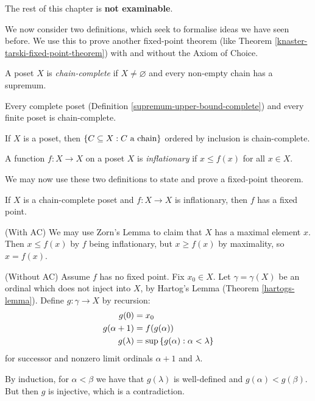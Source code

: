 \documentclass{article}
\begin{document}
\begin{note}
	The rest of this chapter is \textbf{not examinable}.
\end{note}

We now consider two definitions, which seek to formalise ideas we have seen before. We use this to prove another fixed-point theorem (like Theorem \ref{knaster-tarski-fixed-point-theorem}) with and without the Axiom of Choice.

\begin{definition}
    A poset $X$ is \textit{chain-complete} if $X \neq \varnothing$ and every non-empty chain has a supremum.
\end{definition}

\begin{corollary}
    Every complete poset (Definition \ref{supremum-upper-bound-complete}) and every finite poset is chain-complete.
\end{corollary}

\begin{corollary}
    If $X$ is a poset, then $\left\lbrace C \subseteq X: C \text{ a chain} \right\rbrace$ ordered by inclusion is chain-complete.
\end{corollary}

\begin{definition}[Inflationary]
    A function $f: X \to X$ on a poset $X$ is \textit{inflationary} if $x \leq f(x)$ for all $x \in X$.
\end{definition}

We may now use these two definitions to state and prove a fixed-point theorem.

\begin{theorem}
    If $X$ is a chain-complete poset and $f : X \to X$ is inflationary, then $f$ has a fixed point.
\end{theorem}

\begin{prf}
    (With AC) We may use Zorn's Lemma to claim that $X$ has a maximal element $x$. Then $x \leq f(x)$ by $f$ being inflationary, but $x \geq f(x)$ by maximality, so $x = f(x)$.
\end{prf}

\begin{prf}
    (Without AC) Assume $f$ has no fixed point. Fix $x_0 \in X$. Let $\gamma = \gamma(X)$ be an ordinal which does not inject into $X$, by Hartog's Lemma (Theorem \ref{hartogs-lemma}). Define $g : \gamma \to X$ by recursion:
	\begin{align*}
    	g(0) &= x_0 \\
    	g(\alpha + 1) &= f(g(\alpha)) \\
    	g(\lambda) &= \sup \left\lbrace g(\alpha) : \alpha < \lambda \right\rbrace
	\end{align*}
	for successor and nonzero limit ordinals $\alpha+1$ and $\lambda$.
	
	By induction, for $\alpha < \beta$ we have that $g(\lambda)$ is well-defined and $g(\alpha) < g(\beta)$. But then $g$ is injective, which is a contradiction.
\end{prf}
\end{document}
